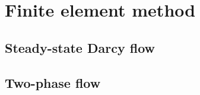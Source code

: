 \section{Finite element method}
\label{fem}

\subsection{Steady-state Darcy flow}
\label{darcy-flow-fem}

\subsection{Two-phase flow}
\label{two-phase-flow}

